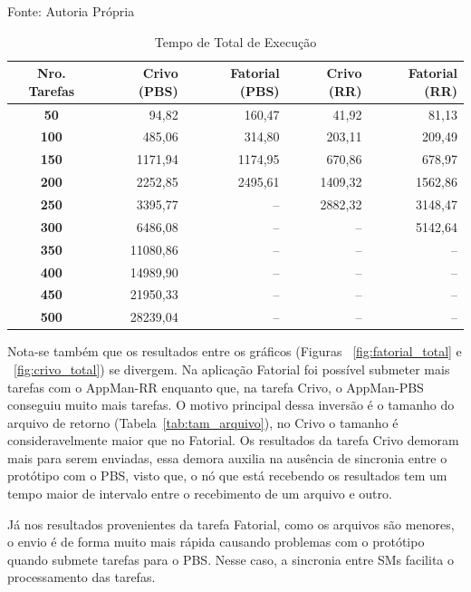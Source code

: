 \begin{table}[hbtp]
\begin{center}
\caption{Tempo de Total de Execução}
\label{tab:tempo_total}
\begin{center}
Fonte: Autoria Própria
\end{center}
\begin{tabular}{c|r|r|r|r}
	\hline
		{\bf Nro. Tarefas } & {\bf Crivo (PBS)} & {\bf Fatorial (PBS)} & {\bf Crivo (RR)} & {\bf Fatorial (RR)}\\
	\hline
	{\bf 50} & 94,82 & 160,47 & 41,92 & 81,13\\ \hline
	{\bf 100} & 485,06 & 314,80 & 203,11 & 209,49\\ \hline
	{\bf 150} & 1171,94 & 1174,95 & 670,86 & 678,97\\ \hline
	{\bf 200} & 2252,85 & 2495,61 & 1409,32 & 1562,86\\ \hline
	{\bf 250} & 3395,77 & -- & 2882,32 & 3148,47\\ \hline
	{\bf 300} & 6486,08 & -- & -- & 5142,64\\ \hline
	{\bf 350} & 11080,86 & -- & -- & --\\ \hline
	{\bf 400} & 14989,90 & -- & -- & --\\ \hline
	{\bf 450} & 21950,33 & -- & -- & --\\ \hline
	{\bf 500} & 28239,04 & -- & -- & --\\ \hline
\end{tabular}
\end{center}
\end{table}
	
Nota-se também que os resultados entre os gráficos (Figuras ~\ref{fig:fatorial_total} e ~\ref{fig:crivo_total}) se divergem. Na aplicação Fatorial foi possível submeter mais tarefas com o AppMan-RR enquanto que, na tarefa Crivo, o AppMan-PBS conseguiu muito mais tarefas. O motivo principal dessa inversão é o tamanho do arquivo de retorno (Tabela~\ref{tab:tam_arquivo}), no Crivo o tamanho é consideravelmente maior que no Fatorial. Os resultados da tarefa Crivo demoram mais para serem enviadas, essa demora auxilia na ausência de sincronia entre o protótipo com o PBS, visto que, o nó que está recebendo os resultados tem um tempo maior de intervalo entre o recebimento de um arquivo e outro. 

Já nos resultados provenientes da tarefa Fatorial, como os arquivos são menores, o envio é de forma muito mais rápida causando problemas com o protótipo quando submete tarefas para o PBS. Nesse caso, a sincronia entre SMs facilita o processamento das tarefas.

